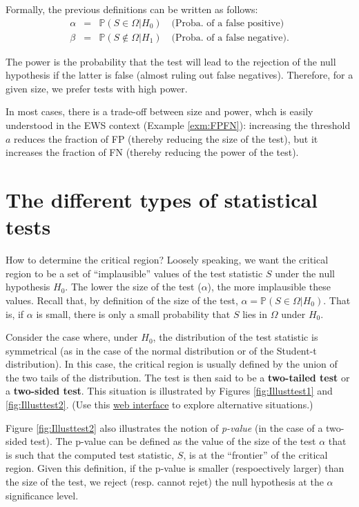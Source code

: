 \documentclass[
  12pt,
]{book}
\theoremstyle{definition}
\theoremstyle{definition}
\theoremstyle{definition}
\theoremstyle{definition}
\theoremstyle{remark}
\begin{document}
Formally, the previous definitions can be written as follows:
\begin{eqnarray}
\alpha &=& \mathbb{P}(S \in \Omega|H_0) \quad \mbox{(Proba. of a false positive)}\\
\beta &=& \mathbb{P}(S \not\in \Omega|H_1) \quad \mbox{(Proba. of a false negative)}.
\end{eqnarray}

The power is the probability that the test will lead to the rejection of the null hypothesis if the latter is false (almost ruling out false negatives). Therefore, for a given size, we prefer tests with high power.

In most cases, there is a trade-off between size and power, whch is easily understood in the EWS context (Example \ref{exm:FPFN}): increasing the threshold \(a\) reduces the fraction of FP (thereby reducing the size of the test), but it increases the fraction of FN (thereby reducing the power of the test).

\hypertarget{the-different-types-of-statistical-tests}{%
\section{The different types of statistical tests}\label{the-different-types-of-statistical-tests}}

How to determine the critical region? Loosely speaking, we want the critical region to be a set of ``implausible'' values of the test statistic \(S\) under the null hypothesis \(H_0\). The lower the size of the test (\(\alpha\)), the more implausible these values. Recall that, by definition of the size of the test, \(\alpha = \mathbb{P}(S \in \Omega|H_0)\). That is, if \(\alpha\) is small, there is only a small probability that \(S\) lies in \(\Omega\) under \(H_0\).

Consider the case where, under \(H_0\), the distribution of the test statistic is symmetrical (as in the case of the normal distribution or of the Student-t distribution). In this case, the critical region is usually defined by the union of the two tails of the distribution. The test is then said to be a \textbf{two-tailed test} or a \textbf{two-sided test}. This situation is illustrated by Figures \ref{fig:Illusttest1} and \ref{fig:Illusttest2}. (Use this \href{https://jrenne.shinyapps.io/tests/}{web interface} to explore alternative situations.)

Figure \ref{fig:Illusttest2} also illustrates the notion of \emph{p-value} (in the case of a two-sided test). The p-value can be defined as the value of the size of the test \(\alpha\) that is such that the computed test statistic, \(S\), is at the ``frontier'' of the critical region. Given this definition, if the p-value is smaller (respoectively larger) than the size of the test, we reject (resp. cannot rejet) the null hypothesis at the \(\alpha\) significance level.
\end{document}

